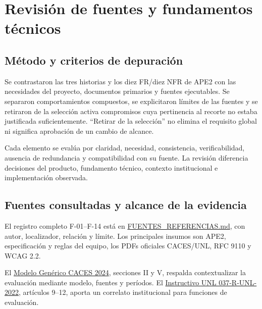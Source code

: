 \documentclass[12pt,a4paper]{report}
\begin{document}
\chapter{Revisión de fuentes y fundamentos
técnicos}\label{dossier-revisiuxf3n-de-fuentes-y-fundamentos-tuxe9cnicos}

\section{Método y criterios de
depuración}\label{dossier-muxe9todo-y-criterios-de-depuraciuxf3n}

Se contrastaron las tres historias y los diez FR/diez NFR de APE2 con
las necesidades del proyecto, documentos primarios y fuentes
ejecutables. Se separaron comportamientos compuestos, se explicitaron
límites de las fuentes y se retiraron de la selección activa compromisos
cuya pertinencia al recorte no estaba justificada suficientemente.
``Retirar de la selección'' no elimina el requisito global ni significa
aprobación de un cambio de alcance.

Cada elemento se evalúa por claridad, necesidad, consistencia,
verificabilidad, ausencia de redundancia y compatibilidad con su fuente.
La revisión diferencia decisiones del producto, fundamento técnico,
contexto institucional e implementación observada.

\section{Fuentes consultadas y alcance de la
evidencia}\label{dossier-fuentes-consultadas-y-alcance-de-la-evidencia}

El registro completo F-01--F-14 está en \url{FUENTES_REFERENCIAS.md},
con autor, localizador, relación y límite. Los principales insumos son
APE2, especificación y reglas del equipo, los PDFs oficiales CACES/UNL,
RFC 9110 y WCAG 2.2.

El
\href{https://www.caces.gob.ec/wp-content/uploads/2024/04/Modelo-generico-para-la-evaluacio\%CC\%81n-del-entorno-de-aprendizaje-de-carreras-de-grado.pdf}{Modelo
Genérico CACES 2024}, secciones II y V, respalda contextualizar la
evaluación mediante modelo, fuentes y períodos. El
\href{https://www.unl.edu.ec/sites/default/files/gaceta/resolucion/2022-06/Resoluci\%C3\%B3n\%20Nro.\%20037-R-UNL-2022-\%20Instructivo\%20para\%20el\%20Aseguramiento\%20de\%20la\%20Calidad\%20de\%20la\%20UNL-signed.pdf}{Instructivo
UNL 037-R-UNL-2022}, artículos 9--12, aporta un correlato institucional
para funciones de evaluación.
\end{document}
